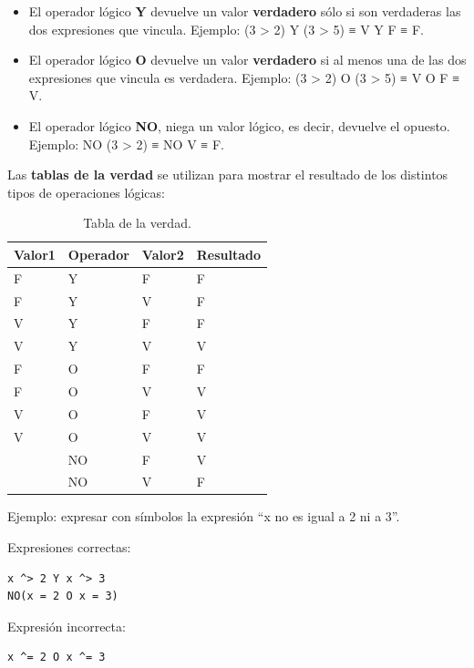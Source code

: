 \documentclass[]{book}
\providecommand{\tightlist}{%
  \setlength{\itemsep}{0pt}\setlength{\parskip}{0pt}}
\begin{document}
\begin{itemize}
\tightlist
\item
  El operador lógico \textbf{Y} devuelve un valor \textbf{verdadero}
  sólo si son verdaderas las dos expresiones que vincula. Ejemplo: (3
  \textgreater{} 2) Y (3 \textgreater{} 5) ≡ V Y F ≡ F.
\item
  El operador lógico \textbf{O} devuelve un valor \textbf{verdadero} si
  al menos una de las dos expresiones que vincula es verdadera. Ejemplo:
  (3 \textgreater{} 2) O (3 \textgreater{} 5) ≡ V O F ≡ V.
\item
  El operador lógico \textbf{NO}, niega un valor lógico, es decir,
  devuelve el opuesto. Ejemplo: NO (3 \textgreater{} 2) ≡ NO V ≡ F.
\end{itemize}

Las \textbf{tablas de la verdad} se utilizan para mostrar el resultado
de los distintos tipos de operaciones lógicas:

\begin{table}

\caption{\label{tab:unnamed-chunk-16}Tabla de la verdad.}
\centering
\begin{tabular}[t]{l|l|l|l}
\hline
Valor1 & Operador & Valor2 & Resultado\\
\hline
F & Y & F & F\\
\hline
F & Y & V & F\\
\hline
V & Y & F & F\\
\hline
V & Y & V & V\\
\hline
F & O & F & F\\
\hline
F & O & V & V\\
\hline
V & O & F & V\\
\hline
V & O & V & V\\
\hline
 & NO & F & V\\
\hline
 & NO & V & F\\
\hline
\end{tabular}
\end{table}

Ejemplo: expresar con símbolos la expresión ``x no es igual a 2 ni a
3''.

Expresiones correctas:

\begin{verbatim}
x ^> 2 Y x ^> 3
NO(x = 2 O x = 3)
\end{verbatim}

Expresión incorrecta:

\begin{verbatim}
x ^= 2 O x ^= 3
\end{verbatim}
\end{document}

